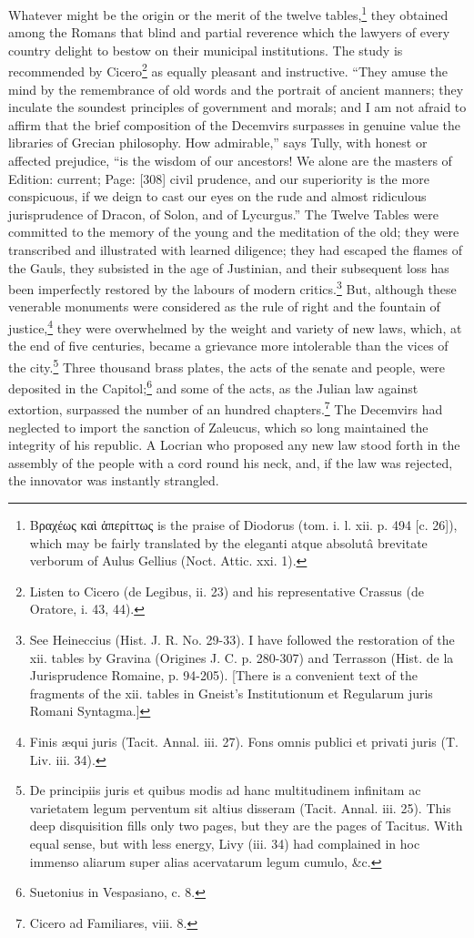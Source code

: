 Whatever might be the origin or the merit of the twelve tables,\footnote{\textgreek{Βραχέως κα\texthebrew{ὶ ἁ}περίττως} is the praise of Diodorus (tom. i. l. xii. p. 494 [c. 26]), which may be fairly translated by the eleganti atque absolutâ brevitate verborum of Aulus Gellius (Noct. Attic. xxi. 1).} they obtained among the Romans that blind and partial reverence which the lawyers of every country delight to bestow on their municipal institutions. The study is recommended by Cicero\footnote{Listen to Cicero (de Legibus, ii. 23) and his representative Crassus (de Oratore, i. 43, 44).} as equally pleasant and instructive. \texthebrew{“}They amuse the mind by the remembrance of old words and the portrait of ancient manners; they inculate the soundest principles of government and morals; and I am not afraid to affirm that the brief composition of the Decemvirs surpasses in genuine value the libraries of Grecian philosophy. How admirable,\texthebrew{}” says Tully, with honest or affected prejudice, \texthebrew{“}is the wisdom of our ancestors! We alone are the masters of Edition: current; Page: [308] civil prudence, and our superiority is the more conspicuous, if we deign to cast our eyes on the rude and almost ridiculous jurisprudence of Dracon, of Solon, and of Lycurgus.\texthebrew{}” The Twelve Tables were committed to the memory of the young and the meditation of the old; they were transcribed and illustrated with learned diligence; they had escaped the flames of the Gauls, they subsisted in the age of Justinian, and their subsequent loss has been imperfectly restored by the labours of modern critics.\footnote{See Heineccius (Hist. J. R. No. 29-33). I have followed the restoration of the xii. tables by Gravina (Origines J. C. p. 280-307) and Terrasson (Hist. de la Jurisprudence Romaine, p. 94-205). [There is a convenient text of the fragments of the xii. tables in Gneist\texthebrew{}’s Institutionum et Regularum juris Romani Syntagma.]} But, although these venerable monuments were considered as the rule of right and the fountain of justice,\footnote{Finis æqui juris (Tacit. Annal. iii. 27). Fons omnis publici et privati juris (T. Liv. iii. 34).} they were overwhelmed by the weight and variety of new laws, which, at the end of five centuries, became a grievance more intolerable than the vices of the city.\footnote{De principiis juris et quibus modis ad hanc multitudinem infinitam ac varietatem legum perventum sit altius disseram (Tacit. Annal. iii. 25). This deep disquisition fills only two pages, but they are the pages of Tacitus. With equal sense, but with less energy, Livy (iii. 34) had complained in hoc immenso aliarum super alias acervatarum legum cumulo, \&c.} Three thousand brass plates, the acts of the senate and people, were deposited in the Capitol;\footnote{Suetonius in Vespasiano, c. 8.} and some of the acts, as the Julian law against extortion, surpassed the number of an hundred chapters.\footnote{Cicero ad Familiares, viii. 8.} The Decemvirs had neglected to import the sanction of Zaleucus, which so long maintained the integrity of his republic. A Locrian who proposed any new law stood forth in the assembly of the people with a cord round his neck, and, if the law was rejected, the innovator was instantly strangled.

